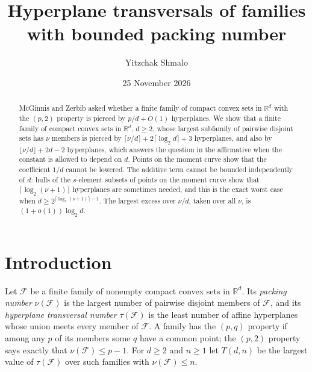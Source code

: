 \documentclass[11pt]{amsart}
\theoremstyle{remark}
\newcommand{\R}{\mathbb R}
\newcommand{\F}{\mathcal F}
\newcommand{\ceil}[1]{\lceil #1\rceil}
\newcommand{\floor}[1]{\lfloor #1\rfloor}
\begin{document}
\title{Hyperplane transversals of families with bounded packing number}
\author{Yitzchak Shmalo}
\date{25 November 2026}
\address{Einstein Institute of Mathematics, The Hebrew University of Jerusalem, Jerusalem, Israel}

\begin{abstract}\label{abs:start}
McGinnis and Zerbib asked whether a finite family of compact convex sets in $\R^d$ with the $(p,2)$ property is pierced
by $p/d+O(1)$ hyperplanes. We show that a finite family of compact convex sets in
$\R^d$, $d\ge2$, whose largest subfamily of pairwise disjoint sets has $\nu$ members is pierced by
$\ceil{\nu/d}+2\ceil{\log_2 d}+3$ hyperplanes, and also by $\floor{\nu/d}+2d-2$ hyperplanes, which answers the
question in the affirmative when the constant is allowed to depend on $d$. Points on the moment curve show that the coefficient $1/d$ cannot be lowered. The additive term cannot be bounded
independently of $d$: hulls of the $s$-element subsets of points on the moment curve show that $\ceil{\log_2(\nu+1)}$
hyperplanes are sometimes needed, and this is the exact worst case when $d\ge 2^{\ceil{\log_2(\nu+1)}-1}$. The largest
excess over $\nu/d$, taken over all $\nu$, is $(1+o(1))\log_2 d$.
\end{abstract}

\maketitle

\section{Introduction}\label{sec:intro}

Let $\F$ be a finite family of nonempty compact convex sets in $\R^d$. Its \emph{packing number} $\nu(\F)$ is the
largest number of pairwise disjoint members of $\F$, and its \emph{hyperplane transversal number} $\tau(\F)$ is the
least number of affine hyperplanes whose union meets every member of $\F$. A family has the $(p,q)$ property if among
any $p$ of its members some $q$ have a common point; the $(p,2)$ property says exactly that $\nu(\F)\le p-1$. For
$d\ge2$ and $n\ge1$ let $T(d,n)$ be the largest value of $\tau(\F)$ over such families with $\nu(\F)\le n$.
\end{document}
